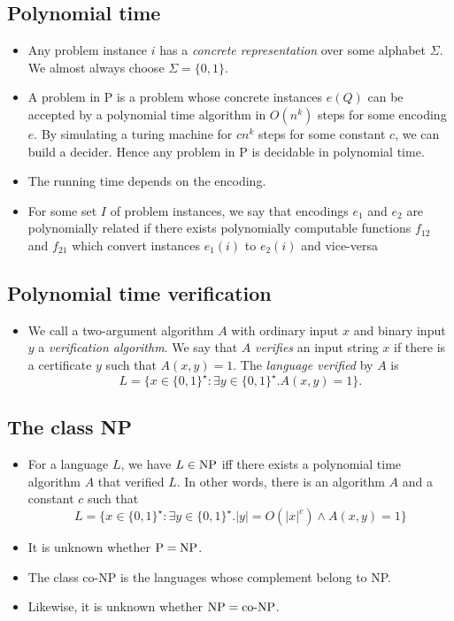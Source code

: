 \subsection{Polynomial time}
\begin{itemize}
\item Any problem instance $i$ has a \emph{concrete representation}
  over some alphabet $\Sigma$. We almost always choose $\Sigma =
  \{0,1\}$.
\item A problem in P is a problem whose concrete instances $e(Q)$ can
  be accepted by a polynomial time algorithm in $O(n^k)$ steps for
  some encoding $e$. By simulating a turing machine for $cn^k$ steps
  for some constant $c$, we can build a decider. Hence any problem in
  P is decidable in polynomial time.
\item The running time depends on the encoding.
\item For some set $I$ of problem instances, we say that encodings
  $e_1$ and $e_2$ are polynomially related if there exists
  polynomially computable functions $f_{12}$ and $f_{21}$ which
  convert instances $e_1(i)$ to $e_2(i)$ and vice-versa
\end{itemize}


\subsection{Polynomial time verification}

\begin{itemize}
\item We call a two-argument algorithm $A$ with ordinary input $x$ and
  binary input $y$ a \emph{verification algorithm}. We say that $A$
  \emph{verifies} an input string $x$ if there is a certificate $y$
  such that $A(x,y) = 1$. The \emph{language verified} by $A$ is
$$
 L = \{ x \in \{0,1\}^\star : \exists y \in \{0,1\}^\star . A(x,y) = 1 \}.
$$
\end{itemize}


\subsection{The class NP}

\begin{itemize}
\item For a language $L$, we have $L \in \mathop{\text{NP}}$ iff there exists a
  polynomial time algorithm $A$ that verified $L$. In other words,
  there is an algorithm $A$ and a constant $c$ such that
$$
 L = \{ x \in \{0,1\}^\star : \exists y \in \{0,1\}^\star . |y| = O(|x|^c) \land A(x,y)=1 \}
$$
\item It is unknown whether $\mathop{\text{P}}=\mathop{\text{NP}}$.
\item The class co-NP is the languages whose complement belong to NP.
\item Likewise, it is unknown whether $\mathop{\text{NP}} = \mathop{\text{co-NP}}$.

\end{itemize}

